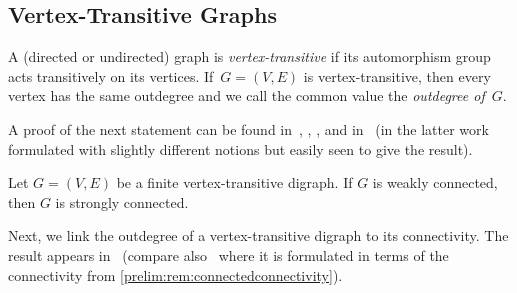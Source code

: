 \subsection{Vertex-Transitive Graphs}
\label{prelim:sec:vertex-transitive}

\label{def:kappa}
A (directed or undirected) graph is \emph{vertex-transitive} if its automorphism group acts transitively on its
vertices.
If~$G = (V,E)$ is vertex-transitive, then every vertex has the same outdegree 
and we call the common value the \emph{outdegree of~$G$}.

A proof of the next statement can be found in~\cite[Thm~1.10]{cameron_1999},
\cite[Thm~1.1]{ArCamSt2017}, \cite[Chap.~2.6]{godsil01},
and in~\cite{Rystsov2022} (in the latter work formulated with slightly different notions but easily seen to give the result).

\begin{theorem}
	\label{prelim:thm:vertex_transitive_finite_graph}
	Let $G = (V, E)$ be a finite vertex-transitive digraph.
	If $G$ is weakly connected, then $G$ is strongly connected.
\end{theorem}

Next, we link the outdegree of a vertex-transitive digraph to its connectivity. The result appears in~\cite[Prop.~3.4]{Hamidoune81} (compare also~\cite[Thm~3.7 (a)]{BabaiSurvey96} where it is formulated
in terms of the connectivity 
from \cref{prelim:rem:connectedconnectivity}).

